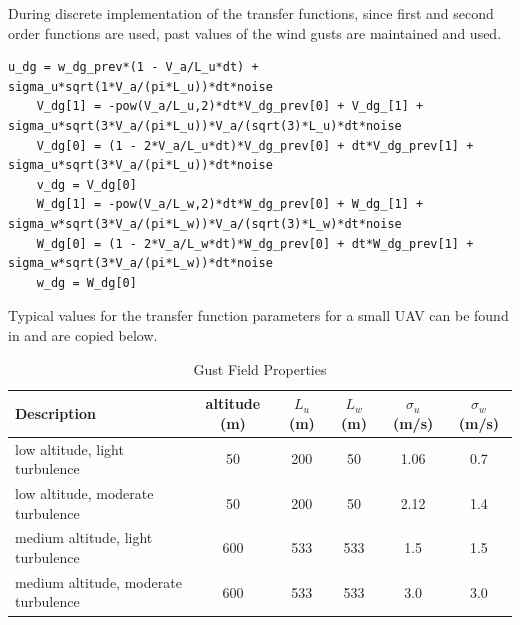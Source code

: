During discrete implementation of the transfer functions, since first and second order functions are used, past values of the wind gusts are maintained and used.
\begin{lstlisting}[style=C-style]
	u_dg = w_dg_prev*(1 - V_a/L_u*dt) + sigma_u*sqrt(1*V_a/(pi*L_u))*dt*noise
	V_dg[1] = -pow(V_a/L_u,2)*dt*V_dg_prev[0] + V_dg_[1] + sigma_u*sqrt(3*V_a/(pi*L_u))*V_a/(sqrt(3)*L_u)*dt*noise
	V_dg[0] = (1 - 2*V_a/L_u*dt)*V_dg_prev[0] + dt*V_dg_prev[1] + sigma_u*sqrt(3*V_a/(pi*L_u))*dt*noise
	v_dg = V_dg[0]
	W_dg[1] = -pow(V_a/L_w,2)*dt*W_dg_prev[0] + W_dg_[1] + sigma_w*sqrt(3*V_a/(pi*L_w))*V_a/(sqrt(3)*L_w)*dt*noise
	W_dg[0] = (1 - 2*V_a/L_w*dt)*W_dg_prev[0] + dt*W_dg_prev[1] + sigma_w*sqrt(3*V_a/(pi*L_w))*dt*noise	
	w_dg = W_dg[0]
\end{lstlisting}


Typical values for the transfer function parameters for a small UAV can be found in \cite{Langelaan2011} and are copied below.
\begin{table}[H]
\centering
\begin{tabular}{|p{5cm}|c|c|c|c|c|}
	\hline
	            Description              & altitude (m) & $L_u$ (m) & $L_w$  (m) & $\sigma _u$ (m/s) & $\sigma _w$ (m/s) \\ \hline
	   low altitude, light turbulence    &      50      &    200    &     50     &       1.06       &       0.7        \\ \hline
	 low altitude, moderate turbulence   &      50      &    200    &     50     &       2.12       &       1.4        \\ \hline
	 medium altitude, light turbulence   &     600      &    533    &    533     &       1.5        &       1.5        \\ \hline
	medium altitude, moderate turbulence &     600      &    533    &    533     &       3.0        &       3.0        \\ \hline
\end{tabular} 
\caption{Gust Field Properties}
\end{table}